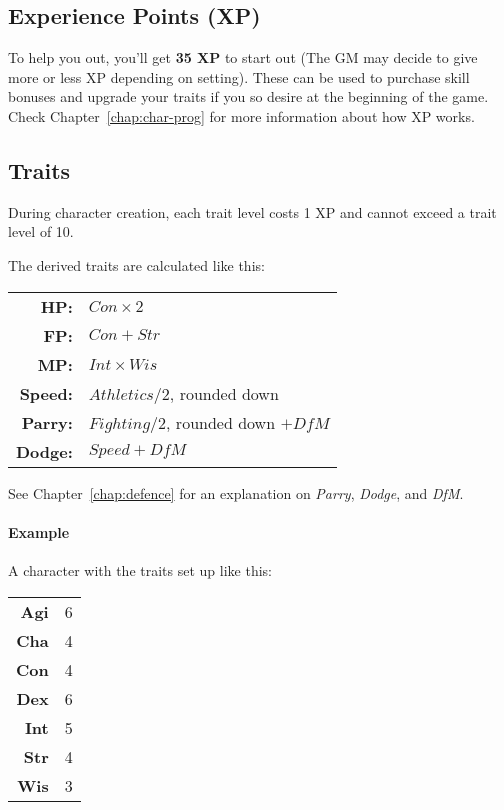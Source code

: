\subsection{Experience Points (XP)}
To help you out, you'll get \textbf{35 XP} to start out (The GM may decide to give more or less XP depending on setting).
These can be used to purchase skill bonuses and upgrade your traits if you so desire at the beginning of the game.
Check Chapter~\ref{chap:char-prog} for more information about how XP works.

\subsection{Traits}
During character creation, each trait level costs 1 XP and cannot exceed a trait level of 10.

The derived traits are calculated like this:

\begin{tabular} {r | l} 
\textbf{HP:} & $Con \times 2$ \\
\textbf{FP:} & $Con + Str$ \\
\textbf{MP:} & $Int \times Wis$ \\
\textbf{Speed:} & $Athletics / 2$, rounded down\\
\textbf{Parry:} & $Fighting / 2$, rounded down $+ \mathit{DfM}$\\
\textbf{Dodge:} & $Speed + \mathit{DfM}$ \\
\end{tabular}

See Chapter~\ref{chap:defence} for an explanation on \textit{Parry}, \textit{Dodge}, and \textit{DfM}.

\paragraph{Example} A character with the traits set up like this:

\begin{tabular}{r | l}
    \textbf{Agi} & 6\\
    \textbf{Cha} & 4\\
    \textbf{Con} & 4\\
    \textbf{Dex} & 6\\
    \textbf{Int} & 5\\
    \textbf{Str} & 4\\
    \textbf{Wis} & 3\\
\end{tabular}

